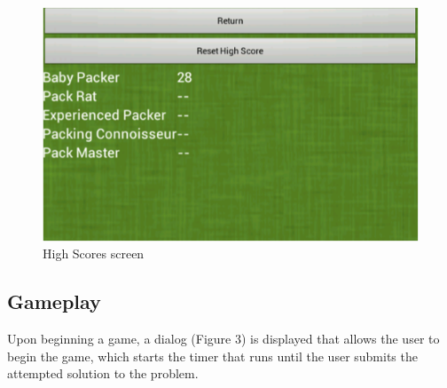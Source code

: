 \documentclass[11pt]{article}
\begin{document}
\begin{figure}[h]
\centering
\includegraphics[scale=0.65]{high_scores.png}
\caption{High Scores screen}
\end{figure}

\subsection{Gameplay}

Upon beginning a game, a dialog (Figure 3) is displayed that allows the user to 
begin the game, which starts the timer that runs until the user submits the
attempted solution to the problem.
\end{document}
